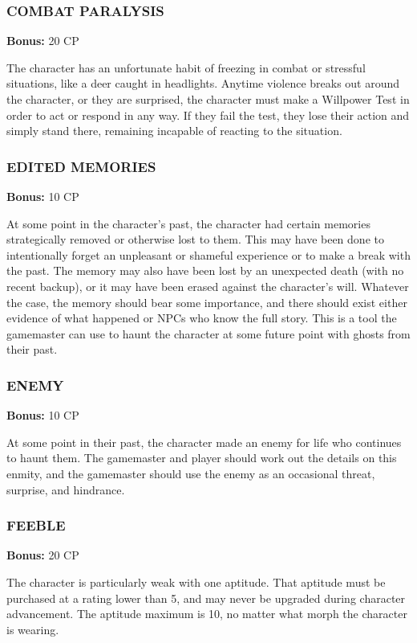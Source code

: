 \subsubsection{COMBAT PARALYSIS}
\textbf{Bonus:} 20 CP

The character has an unfortunate habit of freezing in combat or stressful
situations, like a deer caught in headlights. Anytime violence breaks out
around the character, or they are surprised, the character must make a
Willpower Test in order to act or respond in any way. If they fail the test,
they lose their action and simply stand there, remaining incapable of reacting
to the situation.

\subsubsection{EDITED MEMORIES}
\textbf{Bonus:} 10 CP

At some point in the character’s past, the character had certain memories
strategically removed or otherwise lost to them. This may have been done to
intentionally forget an unpleasant or shameful experience or to make a break
with the past. The memory may also have been lost by an unexpected death (with
no recent backup), or it may have been erased against the character’s
will. Whatever the case, the memory should bear some importance, and there
should exist either evidence of what happened or NPCs who know the full
story. This is a tool the gamemaster can use to haunt the character at some
future point with ghosts from their past.

\subsubsection{ENEMY}
\textbf{Bonus:} 10 CP

At some point in their past, the character made an enemy for life who continues
to haunt them. The gamemaster and player should work out the details on this
enmity, and the gamemaster should use the enemy as an occasional threat,
surprise, and hindrance.

\subsubsection{FEEBLE}
\textbf{Bonus:} 20 CP

The character is particularly weak with one aptitude.  That aptitude must be
purchased at a rating lower than 5, and may never be upgraded during character
advancement. The aptitude maximum is 10, no matter what morph the character is
wearing.

